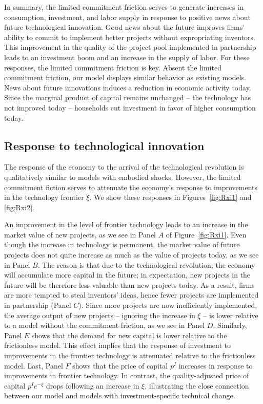 \documentclass[12pt]{article}
\begin{document}
In summary, the limited commitment friction serves to generate increases in  consumption, investment, and labor supply in response to positive news about future technological innovation. Good news about the future improves firms' ability to commit to implement better projects without expropriating inventors. This improvement in the quality of the project pool implemented in partnership leads to an investment boom and an increase in the supply of labor. For these responses, the limited commitment friction is key. Absent the limited commitment friction, our model  displays similar behavior as existing models. News about future innovations induces a reduction in economic activity today. Since the marginal product of capital remains unchanged -- the technology has not improved today --  households cut investment in favor of higher consumption today.






\subsection{Response to  technological innovation}

The response of the economy to the arrival of the technological revolution is qualitatively similar to models with embodied shocks. However, the limited commitment fiction serves to attenuate the economy's response to improvements in the technology frontier $\xi$. We show these responses in Figures~\ref{fig:Rxi1} and \ref{fig:Rxi2}.

 An improvement in the level of frontier technology leads to an increase in the market value of new projects, as we see in Panel $A$ of Figure~\ref{fig:Rxi1}. Even though the increase in technology is permanent, the market value of future projects does not quite increase as much as the value of projects today, as we see in Panel $B$. The   reason is that due to the technological revolution, the economy will accumulate more capital in the future; in expectation, new projects in the future will be therefore less valuable than new projects today. As a result, firms are more tempted to steal inventors' ideas, hence fewer projects are implemented in partnership (Panel $C$). Since more projects are now inefficiently implemented, the average output of new projects -- ignoring the increase in $\xi$ -- is lower relative to a model without the commitment friction, as we see in Panel $D$. Similarly, Panel $E$ shows that the demand for new capital is lower relative to the frictionless model.  This effect implies that the response of investment to improvements in the frontier technology is attenuated relative to the frictionless model.  Last, Panel $F$ shows that the price of capital $p^I$ increases in response to improvements in frontier technology. In contrast, the quality-adjusted price of capital $p^I e^{-\xi}$ drops following an increase in $\xi$, illustrating the close connection between our model and models with investment-specific technical change.
\end{document}
